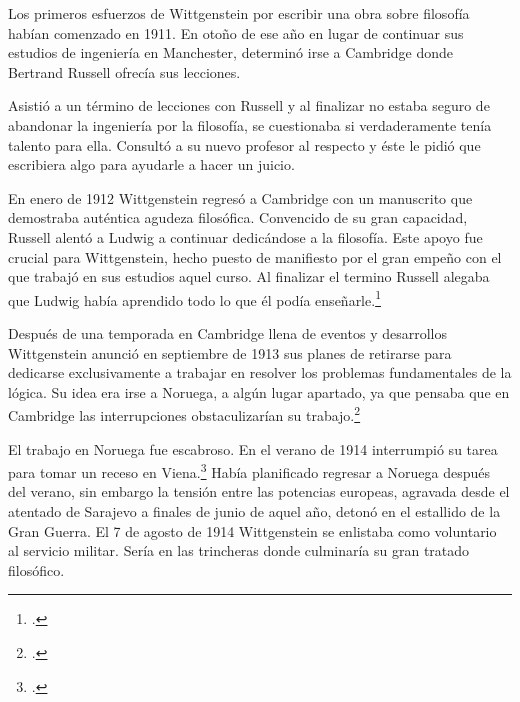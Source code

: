 
Los primeros esfuerzos de Wittgenstein por escribir una obra sobre filosofía
habían comenzado en 1911. En otoño de ese año en lugar de continuar sus estudios
de ingeniería en Manchester, determinó irse a Cambridge donde Bertrand Russell
ofrecía sus lecciones.

Asistió a un término de lecciones con Russell y al finalizar no estaba seguro de
abandonar la ingeniería por la filosofía, se cuestionaba si verdaderamente tenía
talento para ella. Consultó a su nuevo profesor al respecto y éste le pidió que
escribiera algo para ayudarle a hacer un juicio.

En enero de 1912 Wittgenstein regresó a Cambridge con un manuscrito que
demostraba auténtica agudeza filosófica. Convencido de su gran capacidad,
Russell alentó a Ludwig a continuar dedicándose a la filosofía. Este apoyo fue
crucial para Wittgenstein, hecho puesto de manifiesto por el gran empeño con el
que trabajó en sus estudios aquel curso. Al finalizar el termino Russell alegaba
que Ludwig había aprendido todo lo que él podía enseñarle.\footcite[cap. 3 loc
865]{monk}

Después de una temporada en Cambridge llena de eventos y desarrollos
Wittgenstein anunció en septiembre de 1913 sus planes de retirarse para
dedicarse exclusivamente a trabajar en resolver los problemas fundamentales de
la lógica. Su idea era irse a Noruega, a algún lugar apartado, ya que pensaba
que en Cambridge las interrupciones obstaculizarían su trabajo.\footcite[cap. 4
loc 1844]{monk}

 El trabajo en Noruega fue escabroso.
En el verano de 1914 interrumpió su tarea para tomar un receso en
Viena.\footcite[cap. 5 loc 2154]{monk} Había planificado regresar a Noruega
después del verano, sin embargo la tensión entre las potencias europeas,
agravada desde el atentado de Sarajevo a finales de junio de aquel año, detonó
en el estallido de la Gran Guerra. El 7 de agosto de 1914 Wittgenstein se
enlistaba como voluntario al servicio militar. Sería en las trincheras donde
culminaría su gran tratado filosófico.

